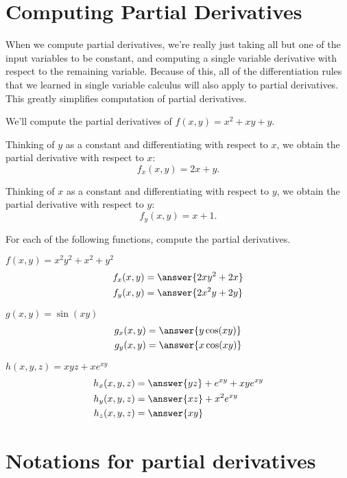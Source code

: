 \documentclass{ximera}
\begin{document}
\section*{Computing Partial Derivatives}

When we compute partial derivatives, we're really just taking all but one of the input variables to be constant, and computing a single variable derivative with respect to the remaining variable. Because of this, all of the differentiation rules that we learned in single variable calculus will also apply to partial derivatives. This greatly simplifies computation of partial derivatives.

\begin{example}
We'll compute the partial derivatives of $f(x,y) = x^2+xy+y$. 

Thinking of $y$ as a constant and differentiating with respect to $x$, we obtain the partial derivative with respect to $x$:
\[
f_x(x,y) = 2x+y.
\]

Thinking of $x$ as a constant and differentiating with respect to $y$, we obtain the partial derivative with respect to $y$:
\[
f_y(x,y) = x+1.
\]
\end{example}

\begin{example}
For each of the following functions, compute the partial derivatives.

$f(x,y) = x^2y^2 + x^2 + y^2$
\begin{align*}
f_x(x,y) &= \answer{2xy^2+2x}\\
f_y(x,y) &= \answer{2x^2y+2y}
\end{align*}

$g(x,y) = \sin(xy)$
\begin{align*}
g_x(x,y) &= \answer{y\cos(xy)}\\
g_y(x,y) &= \answer{x\cos(xy)}
\end{align*}

$h(x,y,z) = xyz + xe^{xy}$
\begin{align*}
h_x(x,y,z) &= \answer{yz} + e^{xy} + xye^{xy}\\
h_y(x,y,z) &= \answer{xz} + x^2e^{xy}\\
h_z(x,y,z) &= \answer{xy}
\end{align*}
\end{example}

\section*{Notations for partial derivatives}
\end{document}
